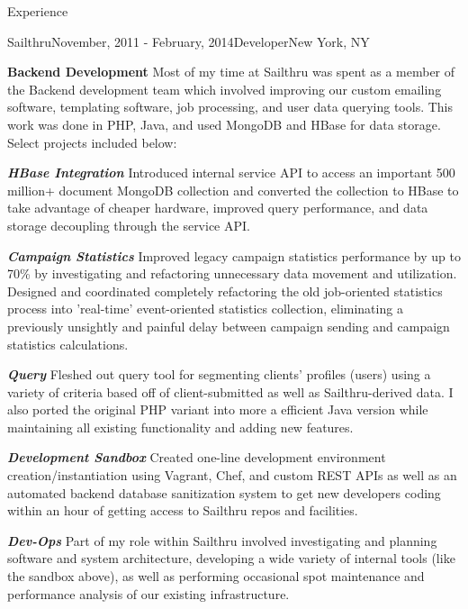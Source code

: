 \documentclass{resume} %
\begin{document}
\begin{rSection}{Experience}
    \begin{rSubsection}{Sailthru}{November, 2011 - February, 2014}{Developer}{New York, NY}
    \item \textbf{Backend Development} Most of my time at Sailthru was spent as a member of the Backend development team which involved improving our custom emailing software, templating software, job processing, and user data querying tools.  This work was done in PHP, Java, and used MongoDB and HBase for data storage.  Select projects included below:
    \item \textbf{\textit{HBase Integration}} Introduced internal service API to access an important 500 million+ document MongoDB collection and converted the collection to HBase to take advantage of cheaper hardware, improved query performance, and data storage decoupling through the service API.
    \item \textbf{\textit{Campaign Statistics}} Improved legacy campaign statistics performance by up to 70\% by investigating and refactoring unnecessary data movement and utilization. Designed and coordinated completely refactoring the old job-oriented statistics process into 'real-time' event-oriented statistics collection, eliminating a previously unsightly and painful delay between campaign sending and campaign statistics calculations.
    \item \textbf{\textit{Query}} Fleshed out query tool for segmenting clients' profiles (users) using a variety of criteria based off of client-submitted as well as Sailthru-derived data. I also ported the original PHP variant into more a efficient Java version while maintaining all existing functionality and adding new features.
    \item \textbf{\textit{Development Sandbox}} Created one-line development environment creation/instantiation using Vagrant, Chef, and custom REST APIs as well as an automated backend database sanitization system to get new developers coding within an hour of getting access to Sailthru repos and facilities.
    \item \textbf{\textit{Dev-Ops}} Part of my role within Sailthru involved investigating and planning software and system architecture, developing a wide variety of internal tools (like the sandbox above), as well as performing occasional spot maintenance and performance analysis of our existing infrastructure.
    \end{rSubsection}



\end{rSection}
\end{document}
